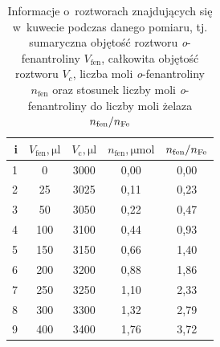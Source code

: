 \documentclass[12pt]{article}
\begin{document}
\begin{table}[H]
    \caption{Informacje o~roztworach znajdujących się w~kuwecie podczas danego pomiaru, tj. sumaryczna objętość roztworu \textit{o}-fenantroliny $V_{\mathrm{fen}}$, całkowita objętość roztworu $V_c$, liczba moli \textit{o}-fenantroliny $n_{\mathrm{fen}}$ oraz stosunek liczby moli \textit{o}-fenantroliny do liczby moli żelaza $n_{\mathrm{fen}}/n_{\ce{Fe}}$}
    \centering
\begin{tabular}{|r|cccc|}
\hline
i & $V_{\mathrm{fen}}, \mathrm{\mu l}$ & $V_{\mathrm{c}}, \mathrm{\mu l}$ & $n_{\mathrm{fen}}, \mathrm{\mu mol}$ & $n_{\mathrm{fen}}/n_{\ce{Fe}}$ \\ \hline
1 & 0                                    & 3000                             & 0,00                                   & 0,00                             \\
2 & 25                                   & 3025                             & 0,11                                   & 0,23                             \\
3 & 50                                   & 3050                             & 0,22                                   & 0,47                             \\
4 & 100                                  & 3100                             & 0,44                                   & 0,93                             \\
5 & 150                                  & 3150                             & 0,66                                   & 1,40                             \\
6 & 200                                  & 3200                             & 0,88                                   & 1,86                             \\
7 & 250                                  & 3250                             & 1,10                                   & 2,33                             \\
8 & 300                                  & 3300                             & 1,32                                   & 2,79                             \\
9 & 400                                  & 3400                             & 1,76                                   & 3,72                             \\ \hline
\end{tabular}
    \label{m2}
\end{table}
\end{document}
